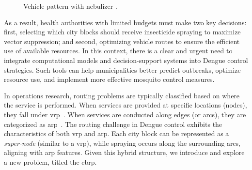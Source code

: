 \begin{figure}[!ht]
	\begin{minipage}[c]{.49\textwidth}
		\centering
		 \end{minipage}%
	\begin{minipage}[c]{.49\textwidth}
		\centering
	\end{minipage}
	\caption{Vehicle pattern with nebulizer \cite{brasil-dept-helth:2009}.}
\end{figure}

As a result, health authorities with limited budgets must make two key
decisions: first, selecting which city blocks should receive insecticide
spraying to maximize vector suppression; and second, optimizing vehicle routes
to ensure the efficient use of available resources. In this context, there is a
clear and urgent need to integrate computational models and decision-support
systems into Dengue control strategies. Such tools can help municipalities
better predict outbreaks, optimize resource use, and implement more effective
mosquito control measures.

In operations research, routing problems are typically classified based on where
the service is performed. When services are provided at specific locations
(nodes), they fall under \gls{vrp}~\citep{braekers2016vehicle}. When services
are conducted along edges (or arcs), they are categorized as
\gls{arp}~\citep{corberan2021arc}. The routing challenge in Dengue control
exhibits the characteristics of both \gls{vrp} and \gls{arp}. Each city block
can be represented as a \textit{super-node} (similar to a \gls{vrp}), while
spraying occurs along the surrounding arcs, aligning with \gls{arp} features.
Given this hybrid structure, we introduce and explore a new problem, titled the
\gls{cbrp}.

